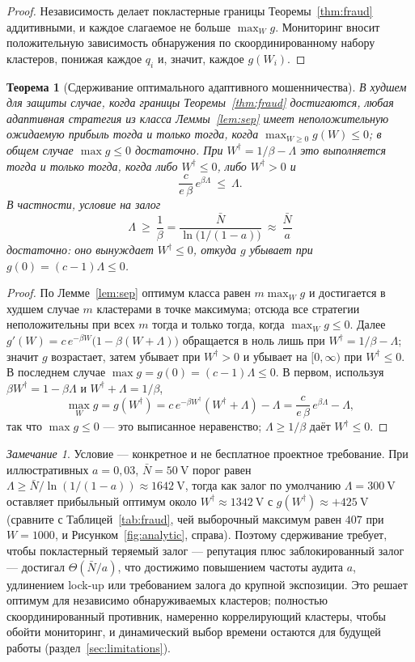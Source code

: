 \documentclass[11pt]{article}
\theoremstyle{plain}
\newtheorem{theorem}{Теорема}
\theoremstyle{definition}
\theoremstyle{remark}
\newtheorem{remark}{Замечание}
\newcommand{\V}{\mathrm{V}}
\begin{document}
\begin{proof}
Независимость делает покластерные границы Теоремы~\ref{thm:fraud} аддитивными, и каждое слагаемое не больше $\max_W g$. Мониторинг вносит положительную зависимость обнаружения по скоординированному набору кластеров, понижая каждое $q_i$ и, значит, каждое $g(W_i)$.
\end{proof}

\begin{theorem}[Сдерживание оптимального адаптивного мошенничества]\label{thm:deter}
В худшем для защиты случае, когда границы Теоремы~\ref{thm:fraud} достигаются, любая адаптивная стратегия из класса Леммы~\ref{lem:sep} имеет неположительную ожидаемую прибыль тогда и только тогда, когда $\max_{W\ge0}g(W)\le0$; в общем случае $\max g\le0$ достаточно. При $W^\dagger=1/\beta-\Lambda$ это выполняется тогда и только тогда, когда либо $W^\dagger\le0$, либо $W^\dagger>0$ и
\[
\frac{c}{e\,\beta}\,e^{\beta \Lambda}\ \le\ \Lambda .
\]
В частности, условие на залог
\[
\Lambda\ \ge\ \frac1\beta=\frac{\bar N}{\ln\!\bigl(1/(1-a)\bigr)}\ \approx\ \frac{\bar N}{a}
\]
достаточно: оно вынуждает $W^\dagger\le0$, откуда $g$ убывает при $g(0)=(c-1)\Lambda\le0$.
\end{theorem}

\begin{proof}
По Лемме~\ref{lem:sep} оптимум класса равен $m\max_W g$ и достигается в худшем случае $m$ кластерами в точке максимума; отсюда все стратегии неположительны при всех $m$ тогда и только тогда, когда $\max_W g\le0$. Далее $g'(W)=c\,e^{-\beta W}\bigl(1-\beta(W+\Lambda)\bigr)$ обращается в ноль лишь при $W^\dagger=1/\beta-\Lambda$; значит $g$ возрастает, затем убывает при $W^\dagger>0$ и убывает на $[0,\infty)$ при $W^\dagger\le0$. В последнем случае $\max g=g(0)=(c-1)\Lambda\le0$. В первом, используя $\beta W^\dagger=1-\beta \Lambda$ и $W^\dagger+\Lambda=1/\beta$,
\[
\max_W g=g(W^\dagger)=c\,e^{-\beta W^\dagger}(W^\dagger+\Lambda)-\Lambda=\frac{c}{e\,\beta}\,e^{\beta \Lambda}-\Lambda ,
\]
так что $\max g\le0$ --- это выписанное неравенство; $\Lambda\ge1/\beta$ даёт $W^\dagger\le0$.
\end{proof}

\begin{remark}
Условие --- конкретное и не бесплатное проектное требование. При иллюстративных $a=0{,}03$, $\bar N=50~\V$ порог равен $\Lambda\ge\bar N/\ln(1/(1-a))\approx1642~\V$, тогда как залог по умолчанию $\Lambda=300~\V$ оставляет прибыльный оптимум около $W^\dagger\approx1342~\V$ с $g(W^\dagger)\approx{+}425~\V$ (сравните с Таблицей~\ref{tab:fraud}, чей выборочный максимум равен $407$ при $W=1000$, и Рисунком~\ref{fig:analytic}, справа). Поэтому сдерживание требует, чтобы покластерный теряемый залог --- репутация плюс заблокированный залог --- достигал $\Theta(\bar N/a)$, что достижимо повышением частоты аудита $a$, удлинением lock-up или требованием залога до крупной экспозиции. Это решает оптимум для независимо обнаруживаемых кластеров; полностью скоординированный противник, намеренно коррелирующий кластеры, чтобы обойти мониторинг, и динамический выбор времени остаются для будущей работы (раздел~\ref{sec:limitations}).
\end{remark}
\end{document}

